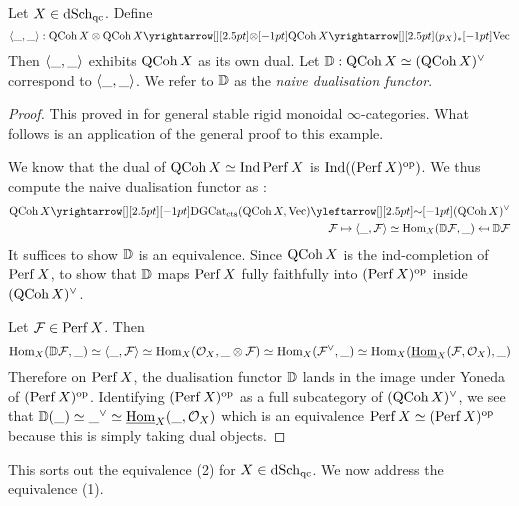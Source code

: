 \documentclass[./main.tex]{subfiles}
\begin{document}
\begin{prop}

  Let $X \in \mathrm{dSch}_\mathrm{qc}$.
  Define \[
    \<\_,\_\> : 
    \QCOH\,X \otimes \QCOH\,X \map{\otimes}{} \QCOH\,X \map{(p_X)_*}{} \VEC
  \]
  Then $\langle\_,\_\rangle$ exhibits $\mathrm{QCoh}\,X$ as its own dual.
  Let $\mathbb{D} : \mathrm{QCoh}\,X \simeq (\mathrm{QCoh}\,X)^\vee$ correspond to $\langle\_,\_\rangle$.
  We refer to $\mathbb{D}$ as the \emph{naive dualisation functor}.

\end{prop}
\begin{proof}
  This proved in \cite[Ch 1 , 9.2]{GR1} for general 
  stable rigid monoidal $\infty$-categories.
  What follows is an application of the general proof to this example.
  
  We know that the dual of $\mathrm{QCoh}\,X \simeq \mathrm{Ind}\,\mathrm{Perf}\,X$
  is $\mathrm{Ind}((\mathrm{Perf}\,X)^{\mathrm{op}})$.
  We thus compute the naive dualisation functor as : 
  \begin{align*}
    \QCOH\,X \map{}{} 
    \DGCAT_\CTS(\QCOH\,X , \VEC) \mapfrom{\sim}{}
    (\QCOH\,X)^\vee \\
    \FF \mapsto 
    \<\_ , \FF \> \simeq \HOM_X(\D \FF , \_)
    \mapsfrom \D \FF
  \end{align*}
  It suffices to show $\mathbb{D}$ is an equivalence.
  Since $\mathrm{QCoh}\,X$ is the ind-completion of $\mathrm{Perf}\,X$,
   to show that
  $\mathbb{D}$ maps $\mathrm{Perf}\,X$ fully faithfully into 
  $(\mathrm{Perf}\,X)^{\mathrm{op}}$ inside $(\mathrm{QCoh}\,X)^\vee$.

  Let $\mathcal{F} \in \mathrm{Perf}\,X$.
  Then \[
    \mathrm{Hom}_X(\mathbb{D} \mathcal{F} , \_) \simeq 
    \langle\_ , \mathcal{F}\rangle \simeq
    \mathrm{Hom}_X(\mathcal{O}_X , \_ \otimes \mathcal{F}) \simeq
    \mathrm{Hom}_X(\mathcal{F}^\vee , \_) \simeq
    \mathrm{Hom}_X(\underline{\mathrm{Hom}}_X(\mathcal{F} , \mathcal{O}_X) , \_)
  \]
  Therefore on $\mathrm{Perf}\,X$, 
  the dualisation functor 
  $\mathbb{D}$ lands in the image under Yoneda of $(\mathrm{Perf}\,X)^{\mathrm{op}}$.
  Identifying $(\mathrm{Perf}\,X)^{\mathrm{op}}$ as a full subcategory of $(\mathrm{QCoh}\,X)^\vee$,
  we see that $\mathbb{D}(\_) \simeq \_^\vee \simeq \underline{\mathrm{Hom}}_X(\_ , \mathcal{O}_X)$
  which is an equivalence $\mathrm{Perf}\,X \simeq (\mathrm{Perf}\,X)^{\mathrm{op}}$
  because this is simply taking dual objects.

\end{proof}

This sorts out the equivalence (2) for $X \in \mathrm{dSch}_\mathrm{qc}$.
We now address the equivalence (1).
\end{document}
